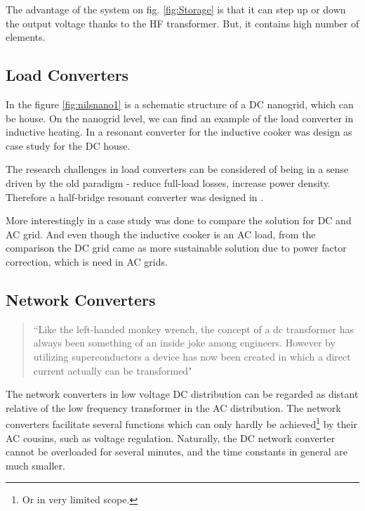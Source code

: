 \documentclass[]{scrartcl}
\begin{document}
The advantage of the system on fig. \ref{fig:Storage} is that it can step up or down the output voltage thanks to the HF transformer. But, it contains high number of elements.


\subsection{Load Converters}

In the figure \ref{fig:nilsnano1} is a schematic structure of a DC nanogrid, which can be house. On the nanogrid level, we can find an example of the load converter in inductive heating.  In \cite{Lucia2013} a resonant converter for the inductive cooker was design as case study for the DC house. 

The research challenges in load converters can be considered of being in a sense driven by the old paradigm\cite{Kolar2009} - reduce full-load losses, increase power density. Therefore a half-bridge resonant converter was designed in \cite{Lucia2013}.  

More interestingly in \cite{Lucia2013} a case study was done to compare the solution for DC and AC grid. And even though the inductive cooker is an AC load, from the comparison the DC grid came as more sustainable solution due to power factor correction, which is need in AC grids.

 

\subsection{Network Converters}

\begin{quotation}
	``Like the left-handed monkey wrench, the concept of a dc transformer has always been something of an inside joke among engineers. However by utilizing superconductors a device has now been created in which a direct current actually can be transformed" \cite{Although}
\end{quotation}

The network converters in low voltage DC distribution can be regarded as distant relative of the low frequency transformer in the AC distribution. The network converters facilitate several functions which can only hardly be achieved\footnote{Or in very limited scope.} by their AC cousins, such as voltage regulation. Naturally, the DC network converter cannot be overloaded for several minutes, and the time constants in general are much smaller. 
\end{document}

